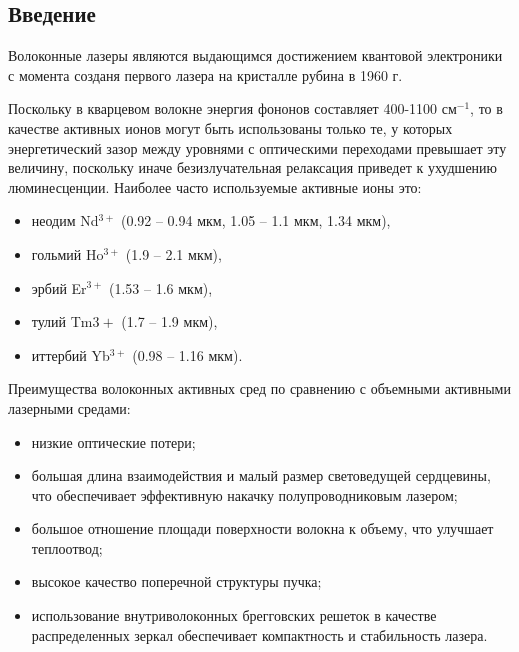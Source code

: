 \documentclass[a4paper, 12pt]{article}
\begin{document}
	\subsection{Введение}
	Волоконные лазеры являются выдающимся достижением квантовой электроники с момента созданя первого лазера на кристалле рубина в 1960 г.\par
	Поскольку в кварцевом волокне энергия фононов составляет 400-1100 см$^{-1}$, то в качестве активных ионов могут быть использованы только те, у которых энергетический зазор между уровнями с оптическими переходами превышает эту величину, поскольку иначе безизлучательная релаксация приведет к ухудшению люминесценции. Наиболее часто используемые активные ионы это:
	\begin{itemize}[noitemsep]
		\item неодим Nd$^{3+}$ (0.92 -- 0.94 мкм, 1.05 -- 1.1 мкм, 1.34 мкм),
		\item гольмий Ho$^{3+}$ (1.9 -- 2.1 мкм),
		\item эрбий Er$^{3+}$ (1.53 -- 1.6 мкм),
		\item тулий Tm${3+}$ (1.7 -- 1.9 мкм),
		\item иттербий Yb$^{3+}$ (0.98 -- 1.16 мкм).
	\end{itemize}\par
	Преимущества волоконных активных сред по сравнению с объемными активными лазерными средами:
	\begin{itemize}[noitemsep]
		\item низкие оптические потери;
		\item большая длина взаимодействия и малый размер световедущей сердцевины, что обеспечивает эффективную накачку полупроводниковым лазером;
		\item большое отношение площади поверхности волокна к объему, что улучшает теплоотвод;
		\item высокое качество поперечной структуры пучка;
		\item использование внутриволоконных брегговских решеток в качестве распределенных зеркал обеспечивает компактность и стабильность лазера.
	\end{itemize}
\end{document}
